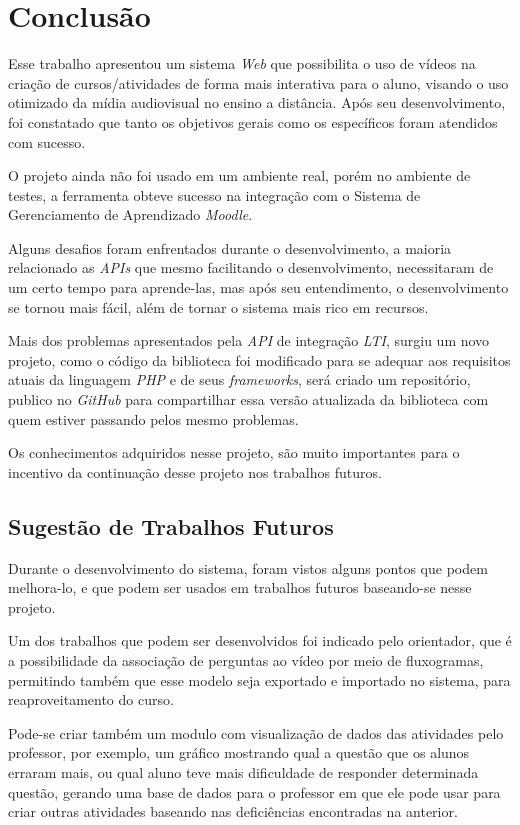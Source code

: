 \chapter{Conclusão}

Esse trabalho apresentou um sistema \textit{Web} que possibilita o uso de vídeos na criação de cursos/atividades de forma mais interativa para o aluno, visando o uso otimizado da mídia audiovisual no ensino a distância. Após seu desenvolvimento, foi constatado que tanto os objetivos gerais como os específicos foram atendidos com sucesso.

O projeto ainda não foi usado em um ambiente real, porém no ambiente de testes, a ferramenta obteve sucesso na integração com o Sistema de Gerenciamento de Aprendizado \textit{Moodle}.

Alguns desafios foram enfrentados durante o desenvolvimento, a maioria relacionado as \textit{APIs} que mesmo facilitando o desenvolvimento, necessitaram de um certo tempo para aprende-las, mas após seu entendimento, o desenvolvimento se tornou mais fácil, além de tornar o sistema mais rico em recursos.

Mais dos problemas apresentados pela \textit{API} de integração \textit{LTI}, surgiu um novo projeto, como o código da biblioteca foi modificado para se adequar aos requisitos atuais da linguagem \textit{PHP} e de seus \textit{frameworks}, será criado um repositório, publico no \textit{GitHub} para compartilhar essa versão atualizada da biblioteca com quem estiver passando pelos mesmo problemas.

Os conhecimentos adquiridos nesse projeto, são muito importantes para o incentivo da continuação desse projeto nos trabalhos futuros.

\section{Sugestão de Trabalhos Futuros}

Durante o desenvolvimento do sistema, foram vistos alguns pontos que podem melhora-lo, e que podem ser usados em trabalhos futuros baseando-se nesse projeto.

Um dos trabalhos que podem ser desenvolvidos foi indicado pelo orientador, que é a possibilidade da associação de perguntas ao vídeo por meio de fluxogramas, permitindo também que esse modelo seja exportado e importado no sistema, para reaproveitamento do curso.

Pode-se criar também um modulo com visualização de dados das atividades pelo professor, por exemplo, um gráfico mostrando qual a questão que os alunos erraram mais, ou qual aluno teve mais dificuldade de responder determinada questão, gerando uma base de dados para o professor em que ele pode usar para criar outras atividades baseando nas deficiências encontradas na anterior.

